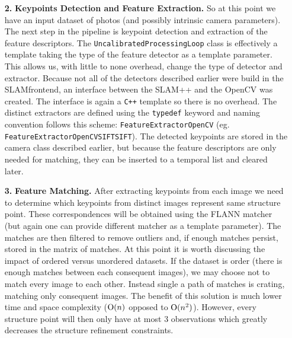 \begin{itemize}
\item[\textbf{2.}] \textbf{Keypoints Detection and Feature Extraction.}
So at this point we have an input dataset of photos (and possibly intrinsic camera parameters). The next step in the pipeline is keypoint detection and extraction of the feature descriptors. The \texttt{UncalibratedProcessingLoop} class is effectively a template taking the type of the feature detector as a template parameter. This allows us, with little to none overhead, change the type of detector and extractor. Because not all of the detectors described earlier were build in the SLAM\textunderscore frontend, an interface between the SLAM++ and the OpenCV was created. The interface is again a \texttt{C++} template so there is no overhead. The distinct extractors are defined using the \texttt{typedef} keyword and naming convention follows this scheme: \texttt{FeatureExtractor\textunderscore OpenCV\textunderscore[detector]\textunderscore[extractor]} (eg. \texttt{FeatureExtractor\textunderscore OpenCV\textunderscore SIFT\textunderscore SIFT}). The detected keypoints are stored in the camera class described earlier, but because the feature descriptors are only needed for matching, they can be inserted to a temporal list and cleared later.

\item[\textbf{3.}] \textbf{Feature Matching.}
After extracting keypoints from each image we need to determine which keypoints from distinct images represent same structure point. These correspondences will be obtained using the FLANN matcher (but again one can provide different matcher as a template parameter). The matches are then filtered to remove outliers and, if enough matches persist, stored in the matrix of matches. At this point it is worth discussing the impact of ordered versus unordered datasets. If the dataset is order (there is enough matches between each consequent images), we may choose not to match every image to each other. Instead single a path of matches is crating, matching only consequent images. The benefit of this solution is much lower time and space complexity ($\textrm O(n)$ opposed to $\textrm O(n^2)$). However, every structure point will then only have at most 3 observations which greatly decreases the structure refinement constraints. 


\end{itemize}
